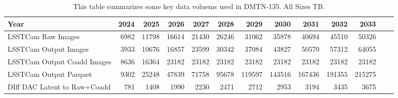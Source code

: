 \tiny \begin{longtable} { |p{}  |r  |r  |r  |r  |r  |r  |r  |r  |r  |r  |r  |r |} 
\caption{This table summarizes some key data voluems used in DMTN-135. All Sizes TB. \label{tab:sizesImages}}\\ 
\hline 
\textbf{Year}&\textbf{2024}&\textbf{2025}&\textbf{2026}&\textbf{2027}&\textbf{2028}&\textbf{2029}&\textbf{2030}&\textbf{2031}&\textbf{2032}&\textbf{2033}& \\ \hline
{LSSTCam Raw Images}&{6982}&{11798}&{16614}&{21430}&{26246}&{31062}&{35878}&{40694}&{45510}&{50326}& \\ \hline
{LSSTCam Output Images}&{3933}&{10676}&{16857}&{23599}&{30342}&{37084}&{43827}&{50570}&{57312}&{64055}& \\ \hline
{LSSTCam Output Coadd Images}&{8636}&{16364}&{23182}&{23182}&{23182}&{23182}&{23182}&{23182}&{23182}&{23182}& \\ \hline
{LSSTCam Output Parquet}&{9302}&{25248}&{47839}&{71758}&{95678}&{119597}&{143516}&{167436}&{191355}&{215275}& \\ \hline
{DIff DAC Latent to Raw+Coadd}&{781}&{1408}&{1990}&{2230}&{2471}&{2712}&{2953}&{3194}&{3435}&{3675}& \\ \hline
\end{longtable} \normalsize
